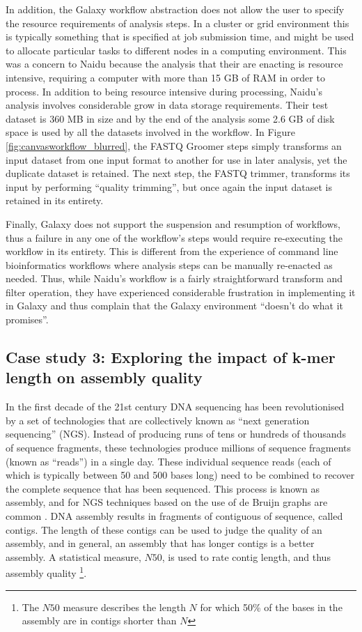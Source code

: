 \documentclass[a4paper,10pt]{scrreprt}
\begin{document}
In addition, the Galaxy workflow abstraction does not allow the user to specify the resource requirements of analysis steps. In a cluster or grid environment this is typically something that is specified at job submission time, and might be used to allocate particular tasks to different nodes in a computing environment. This was a concern to Naidu because the analysis that their are enacting is resource intensive, requiring a computer with more than 15 GB of RAM in order to process. In addition to being resource intensive during processing, Naidu's analysis involves considerable grow in data storage requirements. Their test dataset is 360 MB in size and by the end of the analysis some 2.6 GB of disk space is used by all the datasets involved in the workflow. In Figure \ref{fig:canvasworkflow_blurred}, the FASTQ Groomer steps simply transforms an input dataset from one input format to another for use in later analysis, yet the duplicate dataset is retained. The next step, the FASTQ trimmer, transforms its 
input by performing ``quality trimming'', but once again the input dataset is retained in its entirety.

Finally, Galaxy does not support the suspension and resumption of workflows, thus a failure in any one of the workflow's steps would require re-executing the workflow in its entirety. This is different from the experience of command line bioinformatics workflows where analysis steps can be manually re-enacted as needed. Thus, while Naidu's workflow is a fairly straightforward transform and filter operation, they have experienced considerable frustration in implementing it in Galaxy and thus complain that the Galaxy environment ``doesn't do what it promises''.

\subsection{Case study 3: Exploring the impact of k-mer length on assembly quality}

In the first decade of the 21st century DNA sequencing has been revolutionised by a set of technologies that are collectively known as ``next generation sequencing'' (NGS)\cite{shendure_next-generation_2008}. Instead of producing runs of tens or hundreds of thousands of sequence fragments, these technologies produce millions of sequence fragments (known as ``reads'') in a single day. These individual sequence reads (each of which is typically between 50 and 500 bases long) need to be combined to recover the complete sequence that has been sequenced. This process is known as assembly, and for NGS techniques based on the use of de Bruijn graphs are common \cite{compeau_how_2011}. DNA assembly results in fragments of contiguous of sequence, called contigs. The length of these contigs can be used to judge the quality of an assembly, and in general, an assembly that has longer contigs is a better assembly. A statistical measure, $N50$, is used to rate contig length, and thus assembly quality \cite{burton_n50_2008}
\footnote{The $N50$ measure describes the length $N$ for which 50\% of the bases in the assembly are in contigs shorter than $N$}.
\end{document}
